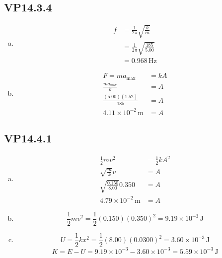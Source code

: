 \documentclass{article}
\begin{document}
\subsection{VP14.3.4}

\begin{enumerate}[a)]
  \item
        \begin{align*}
          f & = \frac{1}{2\pi}\sqrt{\frac{k}{m}}      \\
            & = \frac{1}{2\pi}\sqrt{\frac{185}{5.00}} \\
            & = 0.968\,\textrm{Hz}
        \end{align*}

  \item
        \begin{align*}
          F = ma_\textrm{max}              & = kA \\
          \frac{ma_\textrm{max}}{k}        & = A  \\
          \frac{(5.00)(1.52)}{185}         & = A  \\
          4.11 \times 10^{-2} \,\textrm{m} & = A
        \end{align*}
\end{enumerate}

\subsection{VP14.4.1}

\begin{enumerate}[a)]
  \item
        \begin{align*}
          \frac{1}{2}mv^2                  & = \frac{1}{2}kA^2 \\
          \sqrt{\frac{m}{k}}v              & = A               \\
          \sqrt{\frac{0.150}{8.00}}0.350   & = A               \\
          4.79 \times 10^{-2} \,\textrm{m} & = A
        \end{align*}

  \item \[\frac{1}{2}mv^2 = \frac{1}{2}(0.150)(0.350)^2 = 9.19 \times 10^{-3} \,\textrm{J}\]

  \item
        \[U = \frac{1}{2}kx^2 = \frac{1}{2}(8.00)(0.0300)^2 = 3.60 \times 10^{-3} \,\textrm{J}\]
        \[K = E - U = 9.19 \times 10^{-3} - 3.60 \times 10^{-3} = 5.59 \times 10^{-3} \,\textrm{J}\]
\end{enumerate}
\end{document}
